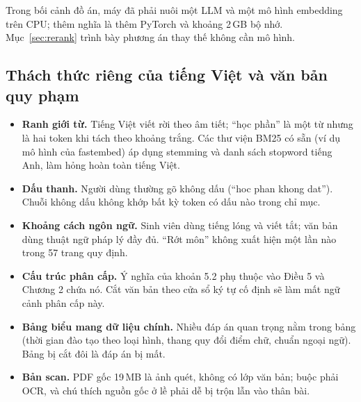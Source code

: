 Trong bối cảnh đồ án, máy đã phải nuôi một LLM và một mô hình embedding trên CPU; thêm
 nghĩa là thêm PyTorch và khoảng 2\,GB bộ nhớ. Mục~\ref{sec:rerank}
trình bày phương án thay thế không cần mô hình.

\subsection{Thách thức riêng của tiếng Việt và văn bản quy phạm}

\begin{itemize}
  \item \textbf{Ranh giới từ.} Tiếng Việt viết rời theo âm tiết; “học phần” là một từ nhưng là
  hai token khi tách theo khoảng trắng. Các thư viện BM25 có sẵn (ví dụ mô hình
   của fastembed) áp dụng stemming và danh sách stopword tiếng Anh, làm hỏng
  hoàn toàn tiếng Việt.
  \item \textbf{Dấu thanh.} Người dùng thường gõ không dấu (“hoc phan khong dat”). Chuỗi không
  dấu không khớp bất kỳ token có dấu nào trong chỉ mục.
  \item \textbf{Khoảng cách ngôn ngữ.} Sinh viên dùng tiếng lóng và viết tắt; văn bản dùng
  thuật ngữ pháp lý đầy đủ. “Rớt môn” không xuất hiện một lần nào trong 57 trang quy định.
  \item \textbf{Cấu trúc phân cấp.} Ý nghĩa của khoản 5.2 phụ thuộc vào Điều 5 và Chương 2 chứa
  nó. Cắt văn bản theo cửa sổ ký tự cố định sẽ làm mất ngữ cảnh phân cấp này.
  \item \textbf{Bảng biểu mang dữ liệu chính.} Nhiều đáp án quan trọng nằm trong bảng (thời
  gian đào tạo theo loại hình, thang quy đổi điểm chữ, chuẩn ngoại ngữ). Bảng bị cắt đôi là đáp
  án bị mất.
  \item \textbf{Bản scan.} PDF gốc 19\,MB là ảnh quét, không có lớp văn bản; buộc phải OCR, và
  chú thích nguồn gốc ở lề phải dễ bị trộn lẫn vào thân bài.
\end{itemize}

\chapterbreak
